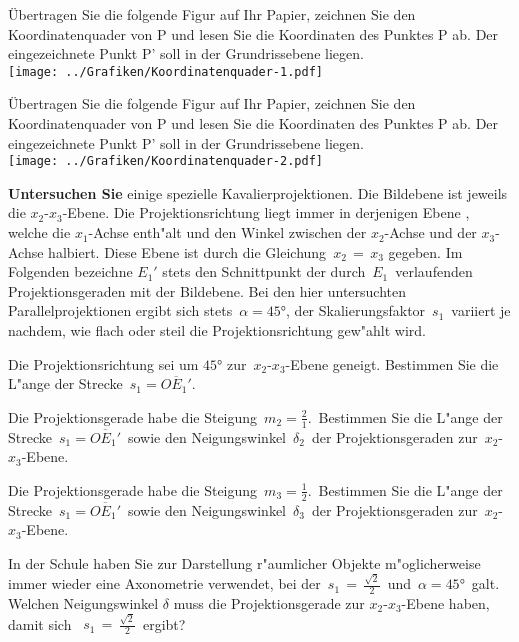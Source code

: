 \begin{Aufgabe}
Übertragen Sie die folgende Figur auf Ihr Papier, zeichnen Sie den Koordinatenquader von P und lesen
Sie die Koordinaten des Punktes P ab. Der eingezeichnete Punkt P’ soll in der Grundrissebene liegen.\\
\texttt{[image: ../Grafiken/Koordinatenquader-1.pdf]}

Übertragen Sie die folgende Figur auf Ihr Papier, zeichnen Sie den Koordinatenquader von P und lesen
Sie die Koordinaten des Punktes P ab. Der eingezeichnete Punkt P’ soll in der Grundrissebene liegen.\\
\texttt{[image: ../Grafiken/Koordinatenquader-2.pdf]}
\end{Aufgabe}
%
\begin{Aufgabe}
\label{Analyse_KavProj}%
\textbf{Untersuchen Sie} einige spezielle Kavalierprojektionen. Die Bildebene ist jeweils die $x_2$-$x_3$-Ebene. Die Projektionsrichtung liegt immer in derjenigen Ebene , welche die $x_1$-Achse enth"alt und den Winkel zwischen der $x_2$-Achse und der $x_3$-Achse halbiert. Diese Ebene ist durch die Gleichung \,$x_2\,=\,x_3$ gegeben. Im Folgenden bezeichne $E_1'$ stets den Schnittpunkt der durch \,$E_1$\, verlaufenden Projektionsgeraden mit der Bildebene. Bei den hier untersuchten Parallelprojektionen ergibt sich stets \,$\alpha = \ang{45}$, der Skalierungsfaktor \,$s_1$\, variiert je nachdem, wie flach oder steil die Projektionsrichtung gew"ahlt wird.
\begin{Teilaufgaben}
\item Die Projektionsrichtung sei um $\ang{45}$ zur \,$x_2$-$x_3$-Ebene geneigt. Bestimmen Sie die L"ange der Strecke \,$s_1= \overline{OE_1'}$.
\item Die Projektionsgerade habe die Steigung \,$m_2 = \frac{2}{1}$.\, Bestimmen Sie die L"ange der Strecke \,$s_1=\overline{OE_1'}$\, sowie den Neigungswinkel \,$\delta_2$\, der Projektionsgeraden zur \,$x_2$-$x_3$-Ebene.
\item Die Projektionsgerade habe die Steigung \,$m_3 = \frac{1}{2}$.\, Bestimmen Sie die L"ange der Strecke \,$s_1=\overline{OE_1'}$\, sowie den Neigungswinkel \,$\delta_3$\, der Projektionsgeraden zur \,$x_2$-$x_3$-Ebene.
\item In der Schule haben Sie zur Darstellung  r"aumlicher Objekte m"oglicherweise immer wieder eine Axonometrie verwendet, bei der \,$s_1\,=\,\tfrac{\sqrt{2}}{2}$\, und \,$\alpha = \ang{45}$\, galt. Welchen Neigungswinkel $\delta$ muss die Projektionsgerade zur $x_2$-$x_3$-Ebene haben, damit sich \, $s_1\,=\,\tfrac{\sqrt{2}}{2}$\, ergibt?
\end{Teilaufgaben}
\end{Aufgabe}
